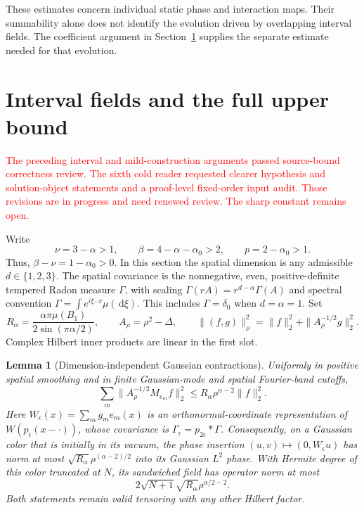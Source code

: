 \documentclass[12pt]{article}
\numberwithin{equation}{section}
\newtheorem{lemma}[theorem]{Lemma}
\theoremstyle{definition}
\newcommand{\ud}{\,\mathrm{d}}
\newcommand{\myCmts}[1]{\begin{framed}\noindent\textcolor{red}{#1}\end{framed}}
\begin{document}
These estimates concern individual static phase and interaction maps.
Their summability alone does not identify the evolution driven by
overlapping interval fields. The coefficient argument in
Section~\ref{S:interval-upper} supplies the separate estimate needed
for that evolution.

\section{Interval fields and the full upper bound}
\label{S:interval-upper}

\myCmts{The preceding interval and mild-construction arguments passed
source-bound correctness review. The sixth cold reader requested clearer
hypothesis and solution-object statements and a proof-level fixed-order
input audit. Those revisions are in progress and need renewed review.
The sharp constant remains open.}

Write
\[
  \nu=3-\alpha>1,\qquad
  \beta=4-\alpha-\alpha_0>2,\qquad p=2-\alpha_0>1.
\]
Thus, $\beta-\nu=1-\alpha_0>0$.
In this section the spatial dimension is any admissible $d\in\{1,2,3\}$.
The spatial covariance is the nonnegative, even, positive-definite tempered
Radon measure $\Gamma$, with scaling
$\Gamma(rA)=r^{d-\alpha}\Gamma(A)$ and spectral convention
$\Gamma=\int e^{i\xi\cdot x}\mu(\ud\xi)$.
This includes $\Gamma=\delta_0$ when $d=\alpha=1$.
Set
\[
  R_\alpha=\frac{\alpha\pi\mu(B_1)}{2\sin(\pi\alpha/2)},\qquad
  A_\rho=\rho^2-\Delta,\qquad
  \|(f,g)\|_\rho^2=\|f\|_2^2+\|A_\rho^{-1/2}g\|_2^2.
\]
Complex Hilbert inner products are linear in the first slot.

\begin{lemma}[Dimension-independent Gaussian contractions]
  \label{L:interval-contractions}
  Uniformly in positive spatial smoothing and in finite Gaussian-mode
  and spatial Fourier-band cutoffs,
  \begin{equation}\label{E:interval-column}
    \sum_m\|A_\rho^{-1/2}M_{e_m}f\|_2^2
    \le R_\alpha\rho^{\alpha-2}\|f\|_2^2.
  \end{equation}
  Here $W_\epsilon(x)=\sum_m g_me_m(x)$ is an orthonormal-coordinate
  representation of $W(p_\epsilon(x-\cdot))$, whose covariance is
  $\Gamma_\epsilon=p_{2\epsilon}*\Gamma$.
  Consequently, on a Gaussian color that is initially in its vacuum,
  the phase insertion $(u,v)\mapsto(0,W_\epsilon u)$ has norm at most
  $\sqrt{R_\alpha}\rho^{(\alpha-2)/2}$ into its Gaussian $L^2$ phase.
  With Hermite degree of this color truncated at $N$, its sandwiched
  field has operator norm at most
  \begin{equation}\label{E:interval-fock}
    2\sqrt{N+1}\sqrt{R_\alpha}\rho^{\alpha/2-2}.
  \end{equation}
  Both statements remain valid tensoring with any other Hilbert factor.
\end{lemma}
\end{document}
